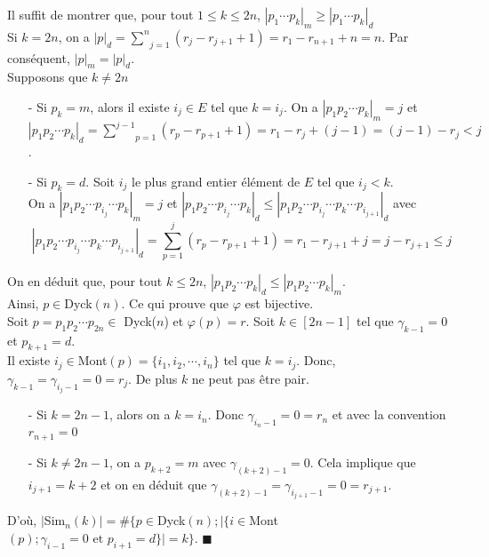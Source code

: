 Il suffit de montrer que, pour tout $1\leq k\leq 2n$, $| p_{1}\cdots p_{k} |_{m}\geq | p_{1}\cdots p_{k} |_{d}$\\
Si $k=2n$, on a $|p|_{d}=\underset{j=1}{\overset{n}{\sum}}(r_{j}-r_{j+1}+1)=r_{1}-r_{n+1}+n=n$. Par conséquent, $|p|_{m}=|p|_{d}$.\\
Supposons que $k\neq 2n$
\begin{itemize}
	\item [-] Si $p_{k}=m$, alors il existe $i_{j}\in E$ tel que $k=i_{j}$. On a $| p_{1}p_{2}\cdots p_{k} |_{m}=j$ et  \\ $| p_{1}p_{2}\cdots p_{k} |_{d}= \underset{p=1}{\overset{j-1}{\sum}}(r_{p}-r_{p+1}+1)=r_{1}-r_{j}+ (j-1)=(j-1)-r_{j}<j$.
	\item [-] Si $p_{k}=d$. Soit $i_{j}$ le plus grand entier élément de $E$ tel que $i_{j}<k$. \\
	      On a $| p_{1}p_{2}\cdots p_{i_{j}}\cdots p_{k} |_{m}=j$ et $| p_{1}p_{2}\cdots p_{i_{j}}\cdots p_{k} |_{d}\leq | p_{1}p_{2}\cdots p_{i_{j}}\cdots p_{k} \cdots p_{i_{j+1}}|_{d}$ avec
	      $$| p_{1}p_{2}\cdots p_{i_{j}}\cdots p_{k} \cdots p_{i_{j+1}}|_{d}= \underset{p=1}{\overset{j}{\sum}}(r_{p}-r_{p+1}+1)=r_{1}-r_{j+1}+j=j-r_{j+1}\leq j$$
\end{itemize}
On en déduit que, pour tout $k \leq 2n$, $| p_{1}p_{2}\cdots p_{k} |_{d} \leq | p_{1}p_{2}\cdots p_{k} |_{m}$.\\ Ainsi, $p\in $\rm{Dyck}$(n)$.
Ce qui prouve que $\varphi$ est bijective.\vspace{10pt}\\
Soit $p=p_{1}p_{2}\cdots p_{2n} \in $ Dyck($n$) et $\varphi(p)=r$.
Soit $k\in [2n-1]$ tel que $\gamma_{k-1}=0$ et $p_{k+1}=d$.\\ Il existe $i_{j}\in $\rm{Mont}$(p)=\{i_{1}, i_{2}, \cdots, i_{n}\}$ tel que $k=i_{j}$. Donc, $\gamma_{k-1}=\gamma_{i_{j}-1}=0=r_{j}$. De plus $k$ ne peut pas être pair.
\begin{itemize}
	\item [-] Si $k=2n-1$, alors on a $k=i_{n}$. Donc $\gamma_{i_{n}-1}=0=r_{n}$ et avec la convention $r_{n+1}=0$
	\item [-] Si $k\neq 2n-1$, on a $p_{k+2}=m$ avec $\gamma_{(k+2)-1}=0$. Cela implique que $i_{j+1} = k+2$ et on en déduit que $\gamma_{(k+2)-1}=\gamma_{i_{j+1}-1}=0=r_{j+1}$.
\end{itemize}
D'où, $|$\rm{Sim}$_{n}(k)| = \# \{p \in $\rm{Dyck}$(n); |\{i \in $\rm{Mont}$(p); \gamma_{i-1}=0 \text{ et } p_{i+1}=d\}|=k\}$. \hspace{10pt}$\blacksquare$

